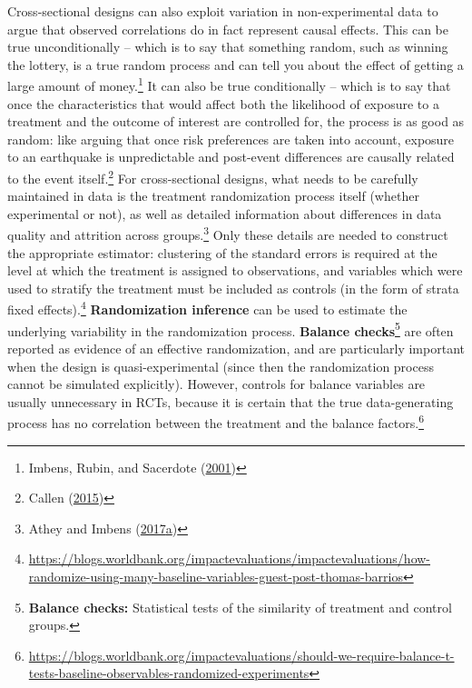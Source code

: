 \documentclass[
]{book}
\begin{document}
Cross-sectional designs can also exploit variation in non-experimental data
to argue that observed correlations do in fact represent causal effects.
This can be true unconditionally -- which is to say that something random,
such as winning the lottery, is a true random process and can tell you about the effect
of getting a large amount of money.\footnote{Imbens, Rubin, and Sacerdote (\protect\hyperlink{ref-imbens2001estimating}{2001})}
It can also be true conditionally -- which is to say that once the
characteristics that would affect both the likelihood of exposure to a treatment
and the outcome of interest are controlled for,
the process is as good as random:
like arguing that once risk preferences are taken into account,
exposure to an earthquake is unpredictable and post-event differences
are causally related to the event itself.\footnote{Callen (\protect\hyperlink{ref-callen2015catastrophes}{2015})}
For cross-sectional designs, what needs to be carefully maintained in data
is the treatment randomization process itself (whether experimental or not),
as well as detailed information about differences
in data quality and attrition across groups.\footnote{Athey and Imbens (\protect\hyperlink{ref-athey2017econometrics}{2017}\protect\hyperlink{ref-athey2017econometrics}{a})}
Only these details are needed to construct the appropriate estimator:
clustering of the standard errors is required at the level
at which the treatment is assigned to observations,
and variables which were used to stratify the treatment
must be included as controls (in the form of strata fixed effects).\footnote{\url{https://blogs.worldbank.org/impactevaluations/impactevaluations/how-randomize-using-many-baseline-variables-guest-post-thomas-barrios}}
\textbf{Randomization inference} can be used
to estimate the underlying variability in the randomization process.
\textbf{Balance checks}\footnote{\textbf{Balance checks:} Statistical tests of the similarity of treatment and control groups.}
are often reported as evidence of an effective randomization,
and are particularly important when the design is quasi-experimental
(since then the randomization process cannot be simulated explicitly).
However, controls for balance variables are usually unnecessary in RCTs,
because it is certain that the true data-generating process
has no correlation between the treatment and the balance factors.\footnote{\url{https://blogs.worldbank.org/impactevaluations/should-we-require-balance-t-tests-baseline-observables-randomized-experiments}}
\end{document}

